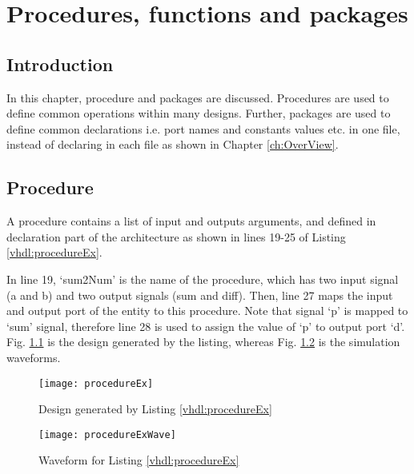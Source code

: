 \chapter{Procedures, functions and packages} \label{ch:Package}

\graphicspath{{Chapters/Package/Figures/}}


\section{Introduction}
In this chapter, procedure and packages are discussed. Procedures are used to define common operations within many designs. Further, packages are used to define common declarations i.e. port names and constants values etc. in one file, instead of declaring in each file as shown in Chapter \ref{ch:OverView}. 

\section{Procedure}
A procedure contains a list of input and outputs arguments, and defined in declaration part of the architecture as shown in lines 19-25 of Listing \ref{vhdl:procedureEx}. 

\begin{explanation}
	In line 19, `sum2Num' is the name of the procedure, which has two input signal (a and b) and two output signals (sum and diff). Then, line 27 maps the input and output port of the entity to this procedure. Note that signal `p' is mapped to `sum' signal, therefore line 28 is used to assign the value of `p' to output port `d'. Fig. \ref{fig:procedureEx} is the design generated by the listing, whereas  Fig. \ref{fig:procedureExWave} is the simulation waveforms. 
\end{explanation}

\begin{figure}[!h]
	\centering
	\texttt{[image: procedureEx]}
	\caption{Design generated by Listing \ref{vhdl:procedureEx}}
	\label{fig:procedureEx}
\end{figure}

\begin{figure}[!h]
	\centering
	\texttt{[image: procedureExWave]}
	\caption{Waveform for Listing \ref{vhdl:procedureEx}}
	\label{fig:procedureExWave}
\end{figure}


